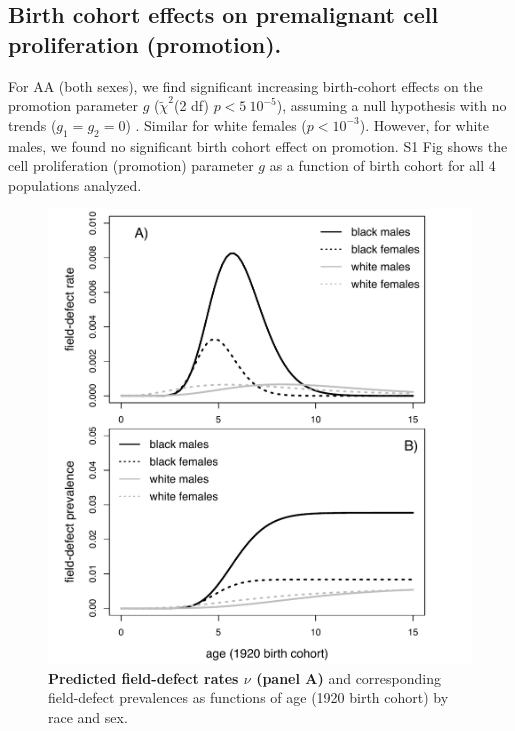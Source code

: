 \documentclass[10pt,letterpaper]{article}
\begin{document}
\subsection*{Birth cohort effects on premalignant cell proliferation (promotion).}
For AA (both sexes), we find significant increasing birth-cohort effects on the promotion parameter $g$ ($\tilde{\chi}^2$(2 df) $p<5\ 10^{-5}$), assuming a null hypothesis with no trends ($g_1=g_2=0$) . Similar for white females ($p< 10^{-3}$). However, for white males, we found no significant birth cohort effect on promotion. S1 Fig shows the cell proliferation (promotion) parameter $g$ as a function of birth cohort for all 4 populations analyzed.

\medskip
\begin{figure}[!ht]
\includegraphics[scale=0.7, trim=0 0 0 0]{Fig6.pdf}
\caption{{\bf Predicted field-defect rates $\nu$ (panel A)} and corresponding field-defect prevalences as functions of age (1920 birth cohort) by race and sex.}
\label{fig6}
\end{figure}
\end{document}
